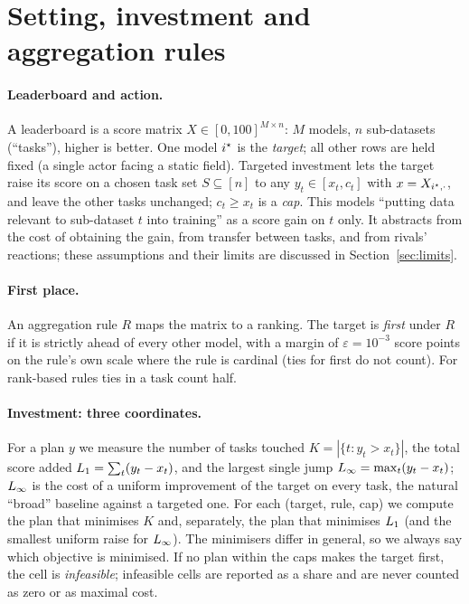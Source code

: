 \section{Setting, investment and aggregation rules}
\label{sec:method}

\paragraph{Leaderboard and action.}
A leaderboard is a score matrix $X\in[0,100]^{M\times n}$: $M$ models, $n$ sub-datasets (``tasks''), higher is better. One model $i^\star$ is the \emph{target}; all other rows are held fixed (a single actor facing a static field). Targeted investment lets the target raise its score on a chosen task set $S\subseteq[n]$ to any $y_t\in[x_t,c_t]$ with $x=X_{i^\star,\cdot}$, and leave the other tasks unchanged; $c_t\ge x_t$ is a \emph{cap}. This models ``putting data relevant to sub-dataset $t$ into training'' as a score gain on $t$ only. It abstracts from the cost of obtaining the gain, from transfer between tasks, and from rivals' reactions; these assumptions and their limits are discussed in Section~\ref{sec:limits}.

\paragraph{First place.}
An aggregation rule $R$ maps the matrix to a ranking. The target is \emph{first} under $R$ if it is strictly ahead of every other model, with a margin of $\varepsilon=10^{-3}$ score points on the rule's own scale where the rule is cardinal (ties for first do not count). For rank-based rules ties in a task count half.

\paragraph{Investment: three coordinates.}
For a plan $y$ we measure the number of tasks touched $K=|\{t:y_t>x_t\}|$, the total score added $L_1=\sum_t(y_t-x_t)$, and the largest single jump $L_\infty=\max_t(y_t-x_t)$; $L_\infty$ is the cost of a uniform improvement of the target on every task, the natural ``broad'' baseline against a targeted one. For each (target, rule, cap) we compute the plan that minimises $K$ and, separately, the plan that minimises $L_1$ (and the smallest uniform raise for $L_\infty$). The minimisers differ in general, so we always say which objective is minimised. If no plan within the caps makes the target first, the cell is \emph{infeasible}; infeasible cells are reported as a share and are never counted as zero or as maximal cost.

